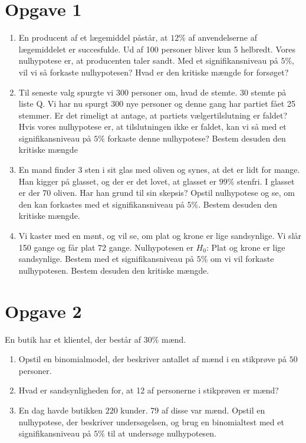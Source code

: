 

\section*{Opgave 1}
\begin{enumerate}[label=\roman*)]
\item En producent af et lægemiddel påstår, at $12\%$ af anvendelserne af lægemiddelet er succesfulde. Ud af 100 personer bliver kun 5 helbredt. Vores nulhypotese er, at producenten taler sandt. Med et signifikansniveau på $5\%$, vil vi så forkaste nulhypotesen? Hvad er den kritiske mængde for forsøget?
\item Til seneste valg spurgte vi 300 personer om, hvad de stemte. 30 stemte på liste Q. Vi har nu spurgt 300 nye personer og denne gang har partiet fået 25 stemmer. Er det rimeligt at antage, at partiets vælgertilslutning er faldet? Hvis vores nulhypotese er, at tilslutningen ikke er faldet, kan vi så med et signifikansniveau på $5\%$ forkaste denne nulhypotese? Bestem desuden den kritiske mængde
\item En mand finder 3 sten i sit glas med oliven og synes, at det er lidt for mange. Han kigger på glasset, og der er det lovet, at glasset er $99\%$ stenfri. I glasset er der 70 oliven. Har han grund til sin skepsis? Opstil nulhypotese og se, om den kan forkastes med et signifikansniveau på $5\%$. Bestem desuden den kritiske mængde. 
\item Vi kaster med en mønt, og vil se, om plat og krone er lige sandsynlige. Vi slår 150 gange og får plat 72 gange. Nulhypotesen er $H_0$: Plat og krone er lige sandsynlige. Bestem med et signifikansniveau på $5\%$ om vi vil forkaste nulhypotesen. Bestem desuden den kritiske mængde. 
\end{enumerate}

\section*{Opgave 2}
En butik har et klientel, der består af $30\%$ mænd. 
\begin{enumerate}[label=\roman*)]
\item Opstil en binomialmodel, der beskriver antallet af mænd i en stikprøve på $50$ personer.
\item Hvad er sandsynligheden for, at 12 af personerne i stikprøven er mænd?
\item En dag havde butikken $220$ kunder. 79 af disse var mænd. Opstil en nulhypotese, der beskriver undersøgelsen, og brug en binomialtest med et signifikansniveau på $5\%$ til at undersøge nulhypotesen. 
\end{enumerate}

